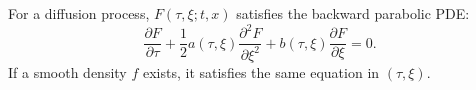 For a diffusion process, $F(\tau, \xi; t, x)$ satisfies the backward parabolic PDE:
$$\frac{\partial F}{\partial \tau} + \frac{1}{2} a(\tau, \xi) \frac{\partial^2 F}{\partial \xi^2} + b(\tau, \xi) \frac{\partial F}{\partial \xi} = 0.$$
If a smooth density $f$ exists, it satisfies the same equation in $(\tau, \xi)$.
